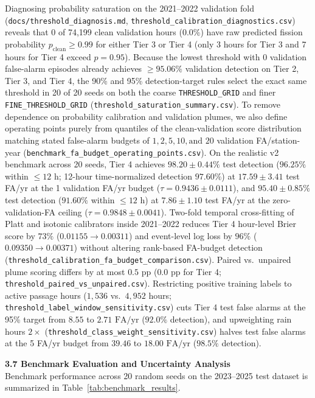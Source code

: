\documentclass[11pt,a4paper]{article}
\begin{document}
\begin{framed}
Diagnosing probability saturation on the 2021--2022 validation fold (\texttt{docs/threshold\_diagnosis.md}, \texttt{threshold\_calibration\_diagnostics.csv}) reveals that 0 of 74,199 clean validation hours ($0.0\%$) have raw predicted fission probability $p_{\text{clean}} \ge 0.99$ for either Tier 3 or Tier 4 (only 3 hours for Tier 3 and 7 hours for Tier 4 exceed $p = 0.95$). Because the lowest threshold with 0 validation false-alarm episodes already achieves $\ge 95.06\%$ validation detection on Tier 2, Tier 3, and Tier 4, the 90\% and 95\% detection-target rules select the exact same threshold in 20 of 20 seeds on both the coarse \texttt{THRESHOLD\_GRID} and finer \texttt{FINE\_THRESHOLD\_GRID} (\texttt{threshold\_saturation\_summary.csv}). To remove dependence on probability calibration and validation plumes, we also define operating points purely from quantiles of the clean-validation score distribution matching stated false-alarm budgets of $1, 2, 5, 10, \text{and } 20$ validation FA/station-year (\texttt{benchmark\_fa\_budget\_operating\_points.csv}). On the realistic v2 benchmark across 20 seeds, Tier 4 achieves $98.20 \pm 0.44\%$ test detection ($96.25\%$ within $\le 12\text{ h}$; 12-hour time-normalized detection $97.60\%$) at $17.59 \pm 3.41$ test FA/yr at the 1 validation FA/yr budget ($\tau = 0.9436 \pm 0.0111$), and $95.40 \pm 0.85\%$ test detection ($91.60\%$ within $\le 12\text{ h}$) at $7.86 \pm 1.10$ test FA/yr at the zero-validation-FA ceiling ($\tau = 0.9848 \pm 0.0041$). Two-fold temporal cross-fitting of Platt and isotonic calibrators inside 2021--2022 reduces Tier 4 hour-level Brier score by $73\%$ ($0.01155 \to 0.00311$) and event-level log loss by $96\%$ ($0.09350 \to 0.00371$) without altering rank-based FA-budget detection (\texttt{threshold\_calibration\_fa\_budget\_comparison.csv}). Paired vs.\ unpaired plume scoring differs by at most $0.5\text{ pp}$ ($0.0\text{ pp}$ for Tier 4; \texttt{threshold\_paired\_vs\_unpaired.csv}). Restricting positive training labels to active passage hours ($1,536$ vs.\ $4,952$ hours; \texttt{threshold\_label\_window\_sensitivity.csv}) cuts Tier 4 test false alarms at the 95\% target from $8.55$ to $2.71\text{ FA/yr}$ ($92.0\%$ detection), and upweighting rain hours $2\times$ (\texttt{threshold\_class\_weight\_sensitivity.csv}) halves test false alarms at the 5 FA/yr budget from $39.46$ to $18.00\text{ FA/yr}$ ($98.5\%$ detection).

\vspace{0.6em}
\noindent\textbf{3.7 Benchmark Evaluation and Uncertainty Analysis}\\[0.3em]
Benchmark performance across 20 random seeds on the 2023--2025 test dataset is summarized in Table~\ref{tab:benchmark_results}.


\end{framed}
\end{document}
